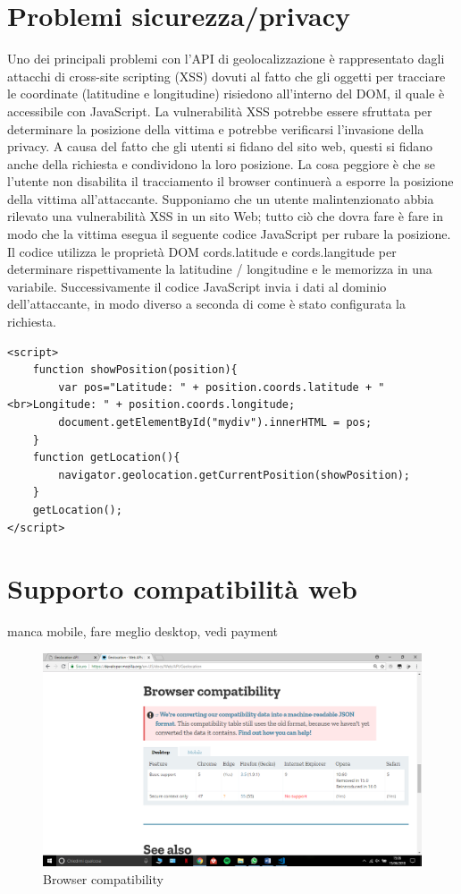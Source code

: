 \documentclass[italian]{article}
\begin{document}
\section{Problemi sicurezza/privacy}
Uno dei principali problemi con l'API di geolocalizzazione è rappresentato dagli attacchi di cross-site scripting (XSS) dovuti al fatto che gli oggetti per tracciare le coordinate (latitudine e longitudine) risiedono all'interno del DOM, il quale è accessibile con JavaScript. La vulnerabilità XSS potrebbe essere sfruttata per determinare la posizione della vittima e potrebbe verificarsi l'invasione della privacy.
A causa del fatto che gli utenti si fidano del sito web, questi si fidano anche della richiesta e condividono 
la loro posizione. 
La cosa peggiore è che se l'utente non disabilita il tracciamento il browser continuerà a esporre la posizione della vittima all'attaccante.
Supponiamo che un utente malintenzionato abbia rilevato una vulnerabilità XSS in un sito Web; tutto ciò che dovra fare è fare in modo che la vittima esegua il seguente codice JavaScript per rubare la posizione.
Il codice utilizza le proprietà DOM cords.latitude e cords.langitude per determinare rispettivamente la latitudine / longitudine e le memorizza in una variabile. Successivamente il codice JavaScript invia i dati al dominio dell'attaccante, in modo diverso a seconda di come è stato configurata la richiesta.	
\pagebreak
\begin{lstlisting}
<script>
	function showPosition(position){
		var pos="Latitude: " + position.coords.latitude + "<br>Longitude: " + position.coords.longitude;
		document.getElementById("mydiv").innerHTML = pos;
	}
	function getLocation(){
		navigator.geolocation.getCurrentPosition(showPosition);
	}
	getLocation();
</script>
\end{lstlisting}
\section{Supporto compatibilità web}
manca mobile, fare meglio desktop, vedi payment
\begin{figure}[h]
	\centering
	\includegraphics[width=1\linewidth]{web1}
	\caption{Browser compatibility}
	\label{fig:Browser compatibility}
\end{figure}
\end{document}
